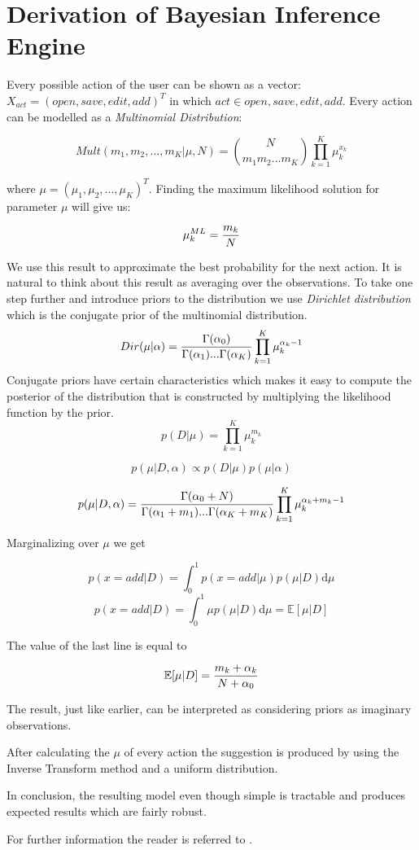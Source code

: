 \section{ Derivation of Bayesian Inference Engine}
Every possible action of the user can be shown as a vector: $X_{act}=(open, save, edit, add)^T$ in which  $act \in {open, save, edit, add}$. Every action can be modelled as a \textit{Multinomial Distribution}:

\[
Mult(m_1,m_2,...,m_K|\mu,N)={N \choose m_1 m_2 ... m_K}\prod_{k=1}^K \mu_{k}^{x_k}
\]

where $\mu=(\mu_1,\mu_2,...,\mu_K)^T$. Finding the maximum likelihood solution for parameter $\mu$ will give us:

\[
\mu_k^{ML}={m_k \over N} 
\]

We use this result to approximate the best probability for the next action. It is natural to think about this result as averaging over the observations.
To take one step further and introduce priors to the distribution we use \textit{Dirichlet distribution} which is the conjugate prior of the multinomial distribution.
\[
Dir(\mu|\alpha)={\Gamma(\alpha_0) \over \Gamma(\alpha_1)...\Gamma(\alpha_K)}\prod_{k=1}^K \mu_{k}^{\alpha_k -1}
\]
Conjugate priors have certain characteristics which makes it easy to compute the posterior of the distribution that is constructed by multiplying the likelihood function by the prior.  
\[
p(D|\mu)=\prod_{k=1}^K {\mu_{k}^{m_k}}\]

\[p(\mu| D,\alpha) \propto p(D|\mu)  p(\mu|\alpha)\]

\[p(\mu|D, \alpha)={\Gamma(\alpha_0+N) \over {\Gamma(\alpha_1+m_1)...\Gamma(\alpha_K+m_K)}}\prod_{k=1}^K \mu_{k}^{\alpha_k+m_k-1}\]

Marginalizing over $\mu$ we get 

\[p(x=add|D)=\int_0^1 p(x=add|\mu)p(\mu|D) \mathrm{d}\mu\]
\[p(x=add|D)=\int_0^1 \mu p(\mu|D)\mathrm{d}\mu = \mathbb{E}[\mu|D]\]

The value of the last line is equal to

\[\mathbb{E}[\mu|D]={m_k+\alpha_k \over {N+\alpha_0}} \]

The result, just like earlier, can be interpreted as considering priors as imaginary observations.

After calculating the $\mu$ of every action the suggestion is produced by using the Inverse Transform method and a uniform distribution.

In conclusion, the resulting model even though simple is tractable and produces expected results which are fairly robust.

For further information the reader is referred to \cite{Bishop2007}.
